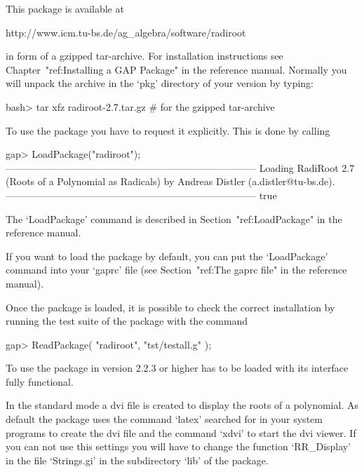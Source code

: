 


This package is available at

\begintt
http://www.icm.tu-bs.de/ag_algebra/software/radiroot
\endtt

in form of a gzipped tar-archive. For installation instructions see
Chapter~"ref:Installing a GAP Package" in the {\GAP} reference manual. 
Normally you will unpack the archive in the `pkg' directory of your
{\GAP} version by typing:

\beginexample
    bash> tar xfz radiroot-2.7.tar.gz        # for the gzipped tar-archive
\endexample


To use the {\Radiroot} package you have to request it explicitly. This  is
done by calling

\beginexample
gap> LoadPackage("radiroot");
-----------------------------------------------------------------------------
Loading  RadiRoot 2.7 (Roots of a Polynomial as Radicals)
by Andreas Distler (a.distler@tu-bs.de).
-----------------------------------------------------------------------------
true
\endexample

The `LoadPackage' command is described  in  Section~"ref:LoadPackage"  in
the {\GAP} reference manual.

If you want to load the {\Radiroot} package by default, you  can  put  the
`LoadPackage' command  into  your  `gaprc'  file  (see  Section~"ref:The
gaprc file" in the {\GAP} reference manual).

Once the package is loaded, it is possible to check the correct
    installation by running the test suite of the package with the command

\beginexample
    gap> ReadPackage( "radiroot", "tst/testall.g" );
\endexample


To use {\Radiroot} the package {\Alnuth} in version 2.2.3 or higher
has to be loaded with its interface fully functional.

In the standard mode a dvi file is created to display the roots of a
polynomial. As default the package uses the command `latex' searched
for in your system programs to create the dvi file and the command
`xdvi' to start the dvi viewer. If you can not use this settings you
will have to change the function `RR_Display' in the file `Strings.gi'
in the subdirectory `lib' of the package.

